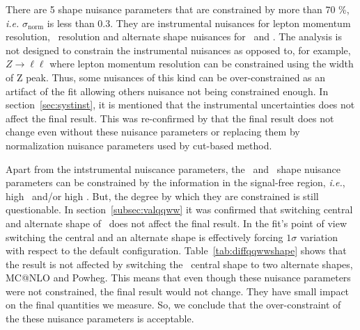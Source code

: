 There are 5 shape nuisance parameters that are constrained by more than 70 \%, 
\textit{i.e.} $\sigma_{\textrm{norm}}$ is less than 0.3. They are 
instrumental nuisances for lepton momentum resolution, \met\ resolution 
and alternate shape nuisances for \qqww\ and \topbkg.
The analysis is not designed to constrain the instrumental nuisances 
as opposed to, for example, $Z\to \ell\ell$ where lepton momentum resolution
can be constrained using the width of Z peak. 
Thus, some nuisances of this kind can be over-constrained 
as an artifact of the fit allowing others nuisance not being constrained enough. 
In section~\ref{sec:systinst}, it is mentioned that 
the instrumental uncertainties does not affect the final result.
This was re-confirmed by that the final result does not change 
even without these nuisance parameters or replacing them by normalization 
nuisance parameters used by cut-based method.  

Apart from the intstrumental nuiscance parameters, the \qqww\ and \topbkg\ shape 
nuisance parameters can be constrained by the information in the signal-free region, 
\textit{i.e.}, high \mT\ and/or high \mll. But, the degree by which they are 
constrained is still questionable. In section~\ref{subsec:valqqww} it was 
confirmed that switching central and alternate shape of \qqww\ does not 
affect the final result. In the fit's point of view switching the central and 
an alternate shape is effectively forcing $1\sigma$ variation 
with respect to the default configuration. Table~\ref{tab:diffqqwwshape} 
shows that the result is not affected by switching the \qqww\ central 
shape to two alternate shapes, MC@NLO and Powheg. 
This means that even though these nuisance parameters were not constrained,
the final result would not change. They have small impact on the final 
quantities we measure. So, we conclude that the over-constraint of the these 
nuisance parameters is acceptable.   
 

